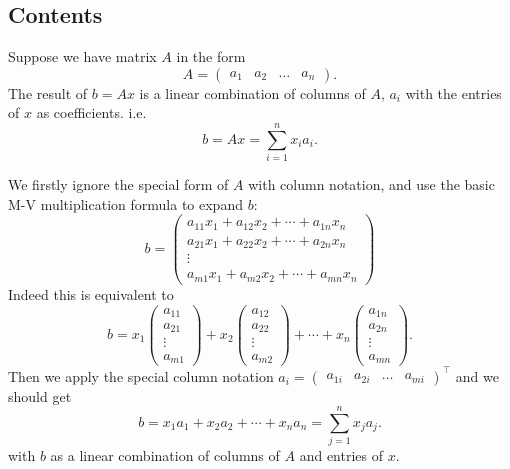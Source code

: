 \subsection*{Contents}
\begin{definition}
  Suppose we have matrix \(A\)  in the form
  \[
    A = \begin{pmatrix}
      a_1 & a_2 & \ldots & a_n
    \end{pmatrix}
  .\]
  The result of \(b = Ax\)  is a linear combination of columns of \(A\), \(a_i\)  with the entries of \(x\)  as coefficients. i.e.
  \[
    b = Ax =  \sum_{i=1}^{n} x_i a_i
  .\]
\end{definition}
\begin{explanation}
  We firstly ignore the special form of \(A\) with column notation, and use the basic M-V multiplication formula to expand \(b\):
  \[
b = \begin{pmatrix} a_{11}x_1 + a_{12}x_2 + \cdots + a_{1n}x_n \\  a_{21}x_1 + a_{22}x_2 + \cdots + a_{2n}x_n\\ \vdots\\a_{m1}x_1 + a_{m2}x_2 + \cdots + a_{mn}x_n \end{pmatrix}
\]
Indeed this is equivalent to
\[
b = x_1\begin{pmatrix} a_{11}\\ a_{21} \\ \vdots\\ a_{m1} \end{pmatrix} + x_2 
\begin{pmatrix} a_{12}\\ a_{22} \\ \vdots\\ a_{m2} \end{pmatrix} + \cdots + x_n 
\begin{pmatrix} a_{1n}\\ a_{2n} \\ \vdots\\ a_{mn} \end{pmatrix}
.\]
Then we apply the special column notation \(a_i = \begin{pmatrix} a_{1i} & a_{2i} & \ldots & a_{mi} \end{pmatrix}^{\top}\) and we should get
\[
  b = x_1a_1 + x_2a_2 + \cdots + x_na_n = \sum_{j=1}^{n} x_j a_j
.\]
with \(b\) as a linear combination of columns of \(A\) and entries of $x$. 
\end{explanation}

